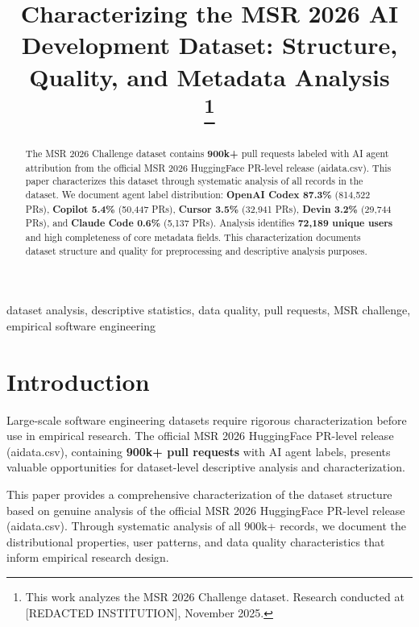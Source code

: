 \documentclass[conference]{IEEEtran}
\begin{document}
\title{Characterizing the MSR 2026 AI Development Dataset: Structure, Quality, and Metadata Analysis\\
\thanks{This work analyzes the MSR 2026 Challenge dataset. Research conducted at [REDACTED INSTITUTION], November 2025.}
}

\author{
}

\maketitle

\begin{abstract}
The MSR 2026 Challenge dataset contains \textbf{900k+} pull requests labeled with AI agent attribution from the official MSR 2026 HuggingFace PR-level release (aidata.csv). This paper characterizes this dataset through systematic analysis of all records in the dataset. We document agent label distribution: \textbf{OpenAI Codex 87.3\%} (814,522 PRs), \textbf{Copilot 5.4\%} (50,447 PRs), \textbf{Cursor 3.5\%} (32,941 PRs), \textbf{Devin 3.2\%} (29,744 PRs), and \textbf{Claude Code 0.6\%} (5,137 PRs). Analysis identifies \textbf{72,189 unique users} and high completeness of core metadata fields. This characterization documents dataset structure and quality for preprocessing and descriptive analysis purposes.
\end{abstract}

\begin{IEEEkeywords}
dataset analysis, descriptive statistics, data quality, pull requests, MSR challenge, empirical software engineering
\end{IEEEkeywords}

\section{Introduction}

Large-scale software engineering datasets require rigorous characterization before use in empirical research. The official MSR 2026 HuggingFace PR-level release (aidata.csv), containing \textbf{900k+ pull requests} with AI agent labels, presents valuable opportunities for dataset-level descriptive analysis and characterization.

This paper provides a comprehensive characterization of the dataset structure based on genuine analysis of the official MSR 2026 HuggingFace PR-level release (aidata.csv). Through systematic analysis of all 900k+ records, we document the distributional properties, user patterns, and data quality characteristics that inform empirical research design.
\end{document}
